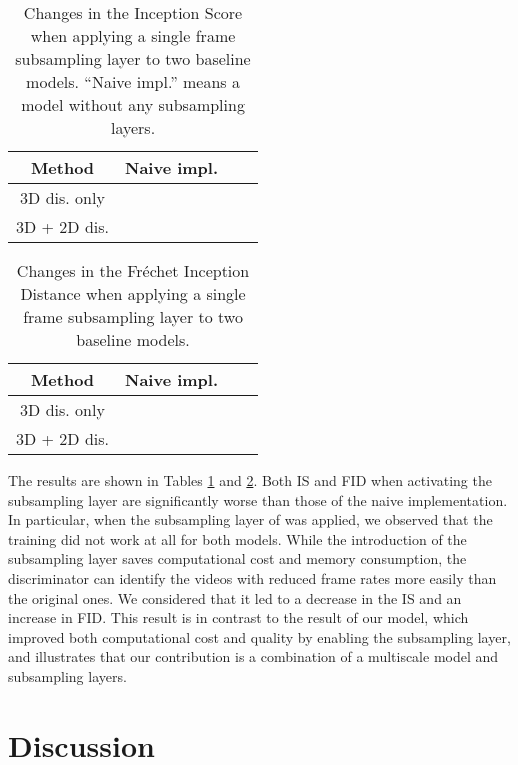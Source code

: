 \documentclass[twocolumn]{svjour3}
\begin{document}
\begin{table}[t]
\centering
{\renewcommand{\arraystretch}{1.2}
\begin{tabular}{c|ccc}
Method & Naive impl. &  &  \\ \hline \hline
3D dis. only &  &  &  \\
3D + 2D dis. &  &  &  \\ \hline
\end{tabular}
}
\caption{Changes in the Inception Score when applying a single frame subsampling layer to two baseline models. ``Naive impl.'' means a model without any subsampling layers.}
\label{table:frame_is}
\end{table}
\begin{table}[t]
\centering
{\renewcommand{\arraystretch}{1.2}
\begin{tabular}{c|ccc}
Method & Naive impl. &  &  \\ \hline \hline
3D dis. only &  &  &  \\
3D + 2D dis. &  &  &  \\ \hline
\end{tabular}
}
\caption{Changes in the Fr\'echet Inception Distance when applying a single frame subsampling layer to two baseline models.}
\label{table:frame_fid}
\end{table}










The results are shown in Tables \ref{table:frame_is} and \ref{table:frame_fid}.
Both IS and FID when activating the subsampling layer are
significantly worse than those of the naive implementation.
In particular, when the subsampling layer of  was applied,
we observed that the training did not work at all for both models.
While the introduction of the subsampling layer saves computational cost and memory consumption,
the discriminator can identify the videos with reduced frame rates more easily than the original ones.
We considered that it led to a decrease in the IS and an increase in FID.
This result is in contrast to the result of our model,
which improved both computational cost and quality by enabling the subsampling layer,
and illustrates that our contribution is a combination of a multiscale model and subsampling layers.

\section{Discussion}
\end{document}
